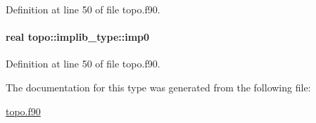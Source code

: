 Definition at line 50 of file topo.\-f90.

\hypertarget{structtopo_1_1implib__type_a782ce248f6ec9d36b585494a68533484}{
\paragraph[{imp0}]{\setlength{\rightskip}{0pt plus 5cm}real topo\-::implib\-\_\-type\-::imp0}}\label{structtopo_1_1implib__type_a782ce248f6ec9d36b585494a68533484}


Definition at line 50 of file topo.\-f90.



The documentation for this type was generated from the following file\-:\begin{DoxyCompactItemize}
\item 
\hyperlink{topo_8f90}{topo.\-f90}\end{DoxyCompactItemize}
